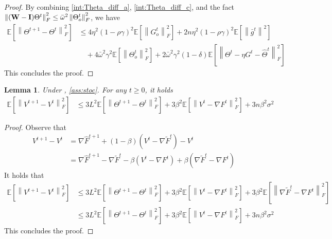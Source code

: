 \documentclass[10pt]{article} %
\theoremstyle{plain}
\newtheorem{lemma}[theorem]{Lemma}
\theoremstyle{definition}
\theoremstyle{remark}
\newcommand{\grdF}{\nabla F}
\newcommand{\bw}{\bar{\omega}}
\newcommand{\avgg}{\bar{g}}
\newcommand{\norm}[1]{\left\| #1 \right\|}
\newcommand{\W}{{\bf W}}
\newcommand{\I}{{\bf I}}
\newcommand{\stocgrdF}{\nabla \widehat{F}}
\newcommand{\stocgrdFp}{\nabla \widetilde{F}}
\begin{document}
\begin{proof}
By combining \eqref{int:Theta_diff_a}, \eqref{int:Theta_diff_c}, and the fact $\norm{ (\W-\I)\Theta^t}_F^2 \leq \bw^2 \norm{\Theta_o^t}_F^2$, we have
\begin{align*}
    \mathbb{E} \left[ \norm{\Theta^{t+1} - \Theta^t}_F^2 \right] &\leq 4 \eta^2(1-\rho\gamma)^2 \mathbb{E} \left[ \norm{G_o^t}_F^2 \right] + 2 n \eta^2(1-\rho\gamma)^2 \mathbb{E} \left[ \norm{ \avgg^t }^2 \right]
    \\ &\quad  + 4 \bw^2 \gamma^2 \mathbb{E} \left[ \norm{\Theta_o^t}_F^2 \right] + 2 \bw^2 \gamma^2(1-\delta) \mathbb{E} \left[ \norm{\Theta^t - \eta G^t - \hat{\Theta}^t}_F^2 \right]
\end{align*}
This concludes the proof.
\end{proof}

\begin{lemma} \label{lem:vt_diffnew} Under , \ref{ass:stoc}. For any $t \geq 0$, it holds
    \begin{align*}
        \mathbb{E} \left[ \norm{V^{t+1} - V^t}_F^2 \right] & \leq 3 L^2 \mathbb{E} \left[ \norm{ \Theta^{t+1} - \Theta^t }_F^2 \right] + 3 \beta^2 \mathbb{E} \left[ \norm{V^t - \grdF^t}_F^2 \right] + 3 n \beta^2 \sigma^2
    \end{align*}
\end{lemma}

\begin{proof}
    Observe that 
    \begin{align*}
        V^{t+1} - V^t & = \stocgrdF^{t+1} + (1-\beta) ( V^t - \stocgrdFp^{t} ) - V^t \\
        & = \stocgrdF^{t+1} - \stocgrdFp^{t} - \beta ( V^t - \grdF^t ) + \beta ( \stocgrdFp^{t} - \grdF^t )
    \end{align*}
    It holds that 
    \begin{align*}
        \mathbb{E} \left[ \norm{V^{t+1} - V^t}_F^2 \right] & \leq 3 L^2 \mathbb{E} \left[ \norm{ \Theta^{t+1} - \Theta^t }_F^2 \right] + 3 \beta^2 \mathbb{E} \left[ \norm{V^t - \grdF^t}_F^2 \right] + 3 \beta^2 \mathbb{E} \left[ \norm{ \stocgrdFp^{t}  - \grdF^t}_F^2 \right] \\
        & \leq 3 L^2 \mathbb{E} \left[ \norm{ \Theta^{t+1} - \Theta^t }_F^2 \right] + 3 \beta^2 \mathbb{E} \left[ \norm{V^t - \grdF^t}_F^2 \right] + 3 n \beta^2 \sigma^2
    \end{align*}
    This concludes the proof.
\end{proof}
\end{document}

